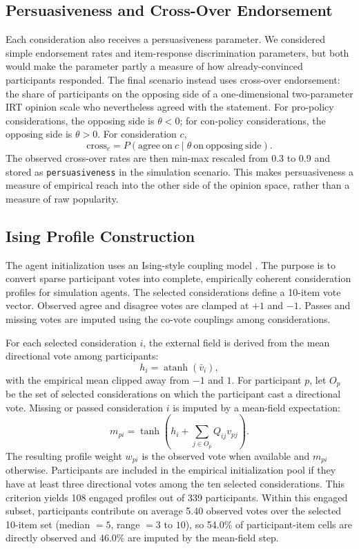 \subsection{Persuasiveness and Cross-Over Endorsement}

Each consideration also receives a persuasiveness parameter. We considered
simple endorsement rates and item-response discrimination parameters, but both
would make the parameter partly a measure of how already-convinced participants
responded. The final scenario instead uses cross-over endorsement: the share of
participants on the opposing side of a one-dimensional two-parameter IRT
opinion scale who nevertheless agreed with the statement. For pro-policy
considerations, the opposing side is $\theta<0$; for con-policy considerations,
the opposing side is $\theta>0$. For consideration $c$,
\[
\mathrm{cross}_c =
P(\mathrm{agree\ on\ } c \mid \theta \mathrm{\ on\ opposing\ side}).
\]
The observed cross-over rates are then min-max rescaled from 0.3 to 0.9 and
stored as \texttt{persuasiveness} in the simulation scenario.
This makes persuasiveness a measure of empirical reach into the other side of
the opinion space, rather than a measure of raw popularity.

\subsection{Ising Profile Construction}

The agent initialization uses an Ising-style coupling model
\citep{ising1925}. The purpose is to convert sparse participant votes into
complete, empirically coherent consideration profiles for simulation agents.
The selected considerations define a 10-item vote vector. Observed agree and
disagree votes are clamped at $+1$ and $-1$. Passes and missing votes are
imputed using the co-vote couplings among considerations.

For each selected consideration $i$, the external field is derived from the
mean directional vote among participants:
\[
h_i = \operatorname{atanh}(\bar v_i),
\]
with the empirical mean clipped away from $-1$ and $1$. For participant $p$,
let $O_p$ be the set of selected considerations on which the participant cast a
directional vote. Missing or passed consideration $i$ is imputed by a
mean-field expectation:
\[
m_{pi} = \tanh\left(h_i + \sum_{j \in O_p} Q_{ij}v_{pj}\right).
\]
The resulting profile weight $w_{pi}$ is the observed vote when available and
$m_{pi}$ otherwise. Participants are included in the empirical initialization
pool if they have at least three directional votes among the ten selected
considerations. This criterion yields 108 engaged profiles out of 339
participants. Within this engaged subset, participants contribute on average
5.40 observed votes over the selected 10-item set (median $=5$, range $=3$ to
$10$), so 54.0\% of participant-item cells are directly observed and 46.0\%
are imputed by the mean-field step.

